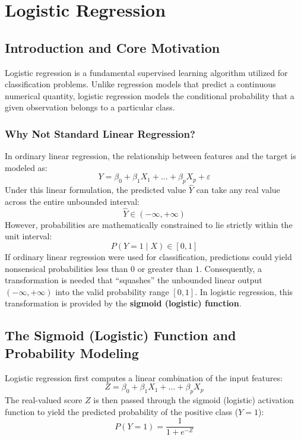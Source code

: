 \chapter{Logistic Regression}

\section{Introduction and Core Motivation}

Logistic regression is a fundamental supervised learning algorithm utilized for classification problems. Unlike regression models that predict a continuous numerical quantity, logistic regression models the conditional probability that a given observation belongs to a particular class.

\subsection{Why Not Standard Linear Regression?}
In ordinary linear regression, the relationship between features and the target is modeled as:
\begin{equation}
Y = \beta_0 + \beta_1 X_1 + \dots + \beta_p X_p + \varepsilon
\end{equation}
Under this linear formulation, the predicted value $\hat{Y}$ can take any real value across the entire unbounded interval:
\begin{equation}
\hat{Y} \in (-\infty, +\infty)
\end{equation}
However, probabilities are mathematically constrained to lie strictly within the unit interval:
\begin{equation}
P(Y = 1 \mid X) \in [0, 1]
\end{equation}
If ordinary linear regression were used for classification, predictions could yield nonsensical probabilities less than $0$ or greater than $1$. Consequently, a transformation is needed that ``squashes'' the unbounded linear output $(-\infty, +\infty)$ into the valid probability range $[0, 1]$. In logistic regression, this transformation is provided by the \textbf{sigmoid (logistic) function}.

\section{The Sigmoid (Logistic) Function and Probability Modeling}

Logistic regression first computes a linear combination of the input features:
\begin{equation}
Z = \beta_0 + \beta_1 X_1 + \dots + \beta_p X_p
\end{equation}
The real-valued score $Z$ is then passed through the sigmoid (logistic) activation function to yield the predicted probability of the positive class ($Y=1$):
\begin{equation}
P(Y=1) = \frac{1}{1 + e^{-Z}}
\end{equation}

